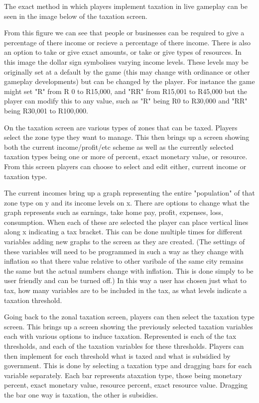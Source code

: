 The exact method in which players implement taxation in live gameplay can be seen in the image below of the taxation screen.


From this figure we can see that people or businesses can be required to give a percentage of there income or recieve a percentage of there income. There is also an option to take or give exact amounts, or take or give types of resources. In this image the dollar sign symbolises varying income levels. These levels may be originally set at a default by the game (this may change with ordinance or other gameplay developments) but can be changed by the player. For instance the game might set "R" from R 0 to R15,000, and "RR" from R15,001 to R45,000 but the player can modify this to any value, such as "R" being R0 to R30,000 and "RR" being R30,001 to R100,000. 

On the taxation screen are various types of zones that can be taxed. Players select the zone type they want to manage. This then brings up a screen showing both the current income/profit/etc scheme as well as the currently selected taxation types being one or more of percent, exact monetary value, or resource. 
From this screen players can choose to select and edit either, current income or taxation type.

The current incomes bring up a graph representing the entire "population" of that zone type on y and its income levels on x. There are options to change what the graph represents such as earnings, take home pay, profit, expenses, loss, consumption. When each of these are selected the player can place vertical lines along x indicating a tax bracket. This can be done multiple times for different variables adding new graphs to the screen as they are created. (The settings of these variables will need to be programmed in such a way as they change with inflation so that there value relative to other varibale of the same city remains the same but the actual numbers change with inflation. This is done simply to be user friendly and can be turned off.) In this way a user has chosen just what to tax, how many variables are to be included in the tax, as what levels indicate a taxation threshold.

Going back to the zonal taxation screen, players can then select the taxation type screen. This brings up a screen showing the previously selected taxation variables each with various options to induce taxation. Represented is each of the tax thresholds, and each of the taxation variables for these thresholds. Players can then implement for each threshold what is taxed and what is subsidied by government. This is done by selecting a taxation type and dragging bars for each variable separately. Each bar represents ataxation type, those being monetary percent, exact monetary value, resource percent, exact resource value. Dragging the bar one way is taxation, the other is subsidies.

